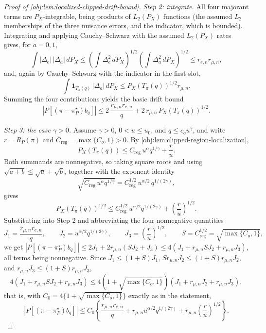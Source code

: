 \documentclass[11pt]{article}
\begin{document}
\begin{proof}[Proof of \cref{obj:lem:localized-clipped-drift-bound}]
\emph{Step 2: integrate.}  All four majorant terms are \(P_X\)-integrable, being products of \(L_2(P_X)\) functions (the assumed \(L_2\) memberships of the three nuisance errors, and the indicator, which is bounded).  Integrating and applying Cauchy--Schwarz with the assumed \(L_2(P_X)\) rates gives, for \(a=0,1\),
\[
\int |\Delta_e|\,|\Delta_a|\,dP_X
   \le \left(\int\Delta_e^2\,dP_X\right)^{1/2}\left(\int\Delta_a^2\,dP_X\right)^{1/2}
   \le r_{e,n}r_{\mu,n},
\]
and, again by Cauchy--Schwarz with the indicator in the first slot,
\[
\int \mathbf 1_{T_\pi(q)}\,|\Delta_a|\,dP_X
\le
P_X\!\left(T_\pi(q)\right)^{1/2}r_{\mu,n}.
\]
Summing the four contributions yields the basic drift bound
\[
\left|P\!\left[(\pi-\pi^\star_P)b_q\right]\right|
\le
2\,\frac{r_{\mu,n}r_{e,n}}{q}
+
2\,r_{\mu,n}\,P_X\!\left(T_\pi(q)\right)^{1/2}.
\]

\emph{Step 3: the case \(\gamma>0\).}  Assume \(\gamma>0\), \(0<u\le u_0\), and \(q\le c_ou^\gamma\), and write \(r=R_P(\pi)\) and \(C_{\mathrm{reg}}=\max\{C_o,1\}>0\).  By \cref{obj:lem:clipped-region-localization},
\[
P_X\!\left(T_\pi(q)\right)
\le
C_{\mathrm{reg}}\,u^\alpha q^{1/\gamma}+\frac{r}{u}.
\]
Both summands are nonnegative, so taking square roots and using \(\sqrt{a+b}\le\sqrt a+\sqrt b\), together with the exponent identity
\[
\sqrt{C_{\mathrm{reg}}\,u^\alpha q^{1/\gamma}}
=
C_{\mathrm{reg}}^{1/2}\,u^{\alpha/2}\,q^{1/(2\gamma)},
\]
gives
\[
P_X\!\left(T_\pi(q)\right)^{1/2}
\le
C_{\mathrm{reg}}^{1/2}\,u^{\alpha/2}q^{1/(2\gamma)}
+
\left(\frac{r}{u}\right)^{1/2}.
\]
Substituting into Step 2 and abbreviating the four nonnegative quantities
\[
J_1=\frac{r_{\mu,n}r_{e,n}}{q},
\qquad
J_2=u^{\alpha/2}q^{1/(2\gamma)},
\qquad
J_3=\left(\frac{r}{u}\right)^{1/2},
\qquad
S=C_{\mathrm{reg}}^{1/2}=\sqrt{\max\{C_o,1\}},
\]
we get \(\left|P[(\pi-\pi^\star_P)b_q]\right|\le 2J_1+2r_{\mu,n}(SJ_2+J_3)\le 4\left(J_1+r_{\mu,n}SJ_2+r_{\mu,n}J_3\right)\), all terms being nonnegative.  Since \(J_1\le(1+S)J_1\), \(Sr_{\mu,n}J_2\le(1+S)r_{\mu,n}J_2\), and \(r_{\mu,n}J_3\le(1+S)r_{\mu,n}J_3\),
\[
4\left(J_1+r_{\mu,n}SJ_2+r_{\mu,n}J_3\right)
\le
4\left(1+\sqrt{\max\{C_o,1\}}\right)\left(J_1+r_{\mu,n}J_2+r_{\mu,n}J_3\right),
\]
that is, with \(C_0=4\{1+\sqrt{\max\{C_o,1\}}\}\) exactly as in the statement,
\[
\left|P\!\left[(\pi-\pi^\star_P)b_q\right]\right|
\le
C_0\left\{
\frac{r_{\mu,n}r_{e,n}}{q}
+
r_{\mu,n}u^{\alpha/2}q^{1/(2\gamma)}
+
r_{\mu,n}\left(\frac{r}{u}\right)^{1/2}
\right\}.
\]


\end{proof}
\end{document}
